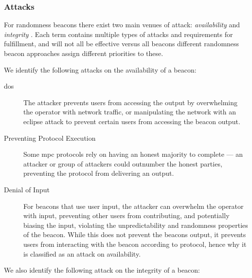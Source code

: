 \subsubsection{Attacks}\label{ssub:security_objectives}
For randomness beacons there exist two main venues of attack: \emph{availability} and \emph{integrity}
.
Each term contains multiple types of attacks and requirements for fulfillment, and will not all be effective versus all beacons different randomness beacon approaches assign different priorities to these.

We identify the following attacks on the availability of a beacon:

\begin{description}
    \item[\acrfull{dos}] The attacker prevents users from accessing the output by overwhelming the operator with network traffic, or manipulating the network with an eclipse attack to prevent certain users from accessing the beacon output.
    \item[Preventing Protocol Execution] Some \gls{mpc} protocols rely on having an honest majority to complete --- an attacker or group of attackers could outnumber the honest parties, preventing the protocol from delivering an output.
    \item[Denial of Input] For beacons that use user input, the attacker can overwhelm the operator with input, preventing other users from contributing, and potentially biasing the input, violating the unpredictability and randomness properties of the beacon. While this does not prevent the beacons output, it prevents users from interacting with the beacon according to protocol, hence why it is classified as an attack on availability.
\end{description}

\noindent%
We also identify the following attack on the integrity of a beacon:


